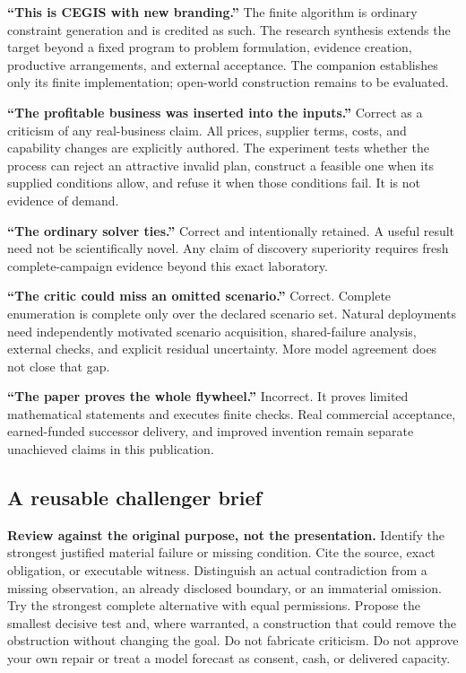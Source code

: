 \documentclass[11pt,a4paper]{article}
\begin{document}
\textbf{``This is CEGIS with new branding.''} The finite algorithm is ordinary constraint generation and is credited as such. The research synthesis extends the target beyond a fixed program to problem formulation, evidence creation, productive arrangements, and external acceptance. The companion establishes only its finite implementation; open-world construction remains to be evaluated.

\textbf{``The profitable business was inserted into the inputs.''} Correct as a criticism of any real-business claim. All prices, supplier terms, costs, and capability changes are explicitly authored. The experiment tests whether the process can reject an attractive invalid plan, construct a feasible one when its supplied conditions allow, and refuse it when those conditions fail. It is not evidence of demand.

\textbf{``The ordinary solver ties.''} Correct and intentionally retained. A useful result need not be scientifically novel. Any claim of discovery superiority requires fresh complete-campaign evidence beyond this exact laboratory.

\textbf{``The critic could miss an omitted scenario.''} Correct. Complete enumeration is complete only over the declared scenario set. Natural deployments need independently motivated scenario acquisition, shared-failure analysis, external checks, and explicit residual uncertainty. More model agreement does not close that gap.

\textbf{``The paper proves the whole flywheel.''} Incorrect. It proves limited mathematical statements and executes finite checks. Real commercial acceptance, earned-funded successor delivery, and improved invention remain separate unachieved claims in this publication.

\subsection{A reusable challenger brief}
\begin{scopebox}
\textbf{Review against the original purpose, not the presentation.} Identify the strongest justified material failure or missing condition. Cite the source, exact obligation, or executable witness. Distinguish an actual contradiction from a missing observation, an already disclosed boundary, or an immaterial omission. Try the strongest complete alternative with equal permissions. Propose the smallest decisive test and, where warranted, a construction that could remove the obstruction without changing the goal. Do not fabricate criticism. Do not approve your own repair or treat a model forecast as consent, cash, or delivered capacity.
\end{scopebox}
\end{document}
